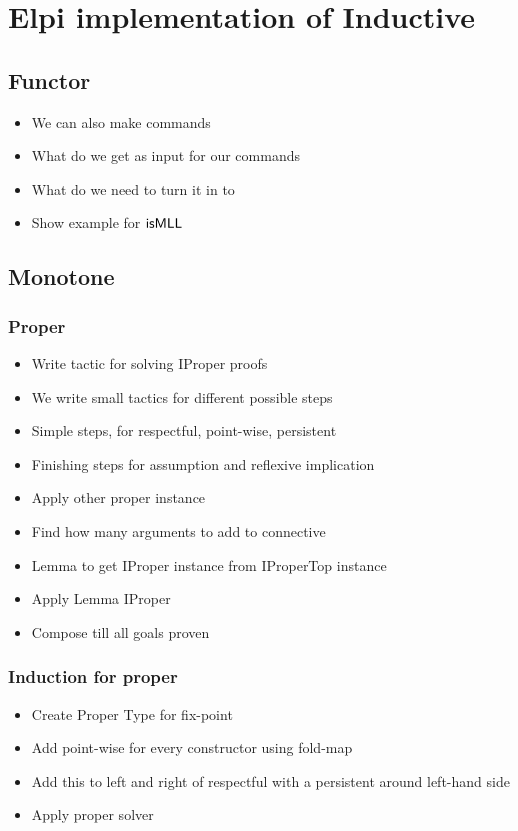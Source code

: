 \documentclass[thesis.tex]{subfiles}
\begin{document}
\chapter{Elpi implementation of Inductive}
    \section{Functor}

    \begin{itemize}
        \item We can also make commands
        \item What do we get as input for our commands
        \item What do we need to turn it in to
        \item Show example for $\textsf{\upshape isMLL}$
    \end{itemize}

    \section{Monotone}
    \subsection{Proper}
    \begin{itemize}
        \item Write tactic for solving IProper proofs
        \item We write small tactics for different possible steps
        \item Simple steps, for respectful, point-wise, persistent
        \item Finishing steps for assumption and reflexive implication
        \item Apply other proper instance
        \item Find how many arguments to add to connective
        \item Lemma to get IProper instance from IProperTop instance
        \item Apply Lemma IProper
        \item Compose till all goals proven
    \end{itemize}

    \subsection{Induction for proper}
    \begin{itemize}
        \item Create Proper Type for fix-point
        \item Add point-wise for every constructor using fold-map
        \item Add this to left and right of respectful with a persistent around left-hand side
        \item Apply proper solver
    \end{itemize}
\end{document}
